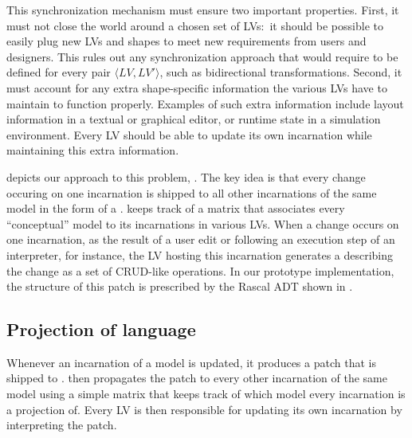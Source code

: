 This synchronization mechanism must ensure two important properties.
First, it must not close the world around a chosen set of LVs:~it should be possible to easily plug new LVs and shapes to meet new requirements from users and designers.
This rules out any synchronization approach that would require to be defined for every pair $\langle LV, LV' \rangle$, such as bidirectional transformations. 
Second, it must account for any extra shape-specific information the various LVs have to maintain to function properly.
Examples of such extra information include layout information in a textual or graphical editor, or runtime state in a simulation environment.
Every LV should be able to update its own incarnation while maintaining this extra information.

 depicts our approach to this problem, \prism.
The key idea is that every change occuring on one incarnation is shipped to all other incarnations of the same model in the form of a \patch.
\prism keeps track of a matrix that associates every ``conceptual'' model to its incarnations in various LVs.
When a change occurs on one incarnation, as the result of a user edit or following an execution step of an interpreter, for instance, the LV hosting this incarnation generates a \patch describing the change as a set of CRUD-like operations.
In our prototype implementation, the structure of this patch is prescribed by the Rascal ADT shown in .

\subsection{Projection of language}

Whenever an incarnation of a model is updated, it produces a patch that is shipped to \prism.
\prism then propagates the patch to every other incarnation of the same model using a simple matrix that keeps track of which model every incarnation is a projection of.
Every LV is then responsible for updating its own incarnation by interpreting the patch.

